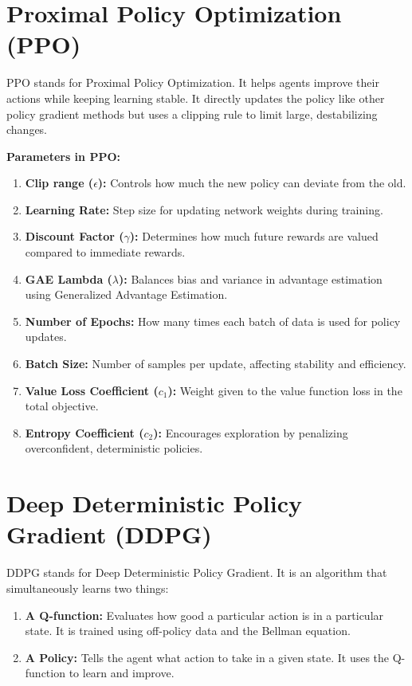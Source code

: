 \documentclass[12pt]{article}
\begin{document}

\section{Proximal Policy Optimization (PPO)}

PPO stands for Proximal Policy Optimization. It helps agents improve their actions while keeping learning stable. It directly updates the policy like other policy gradient methods but uses a clipping rule to limit large, destabilizing changes.

\vspace{2cm}
\textbf{Parameters in PPO:}
\begin{enumerate}
    \item \textbf{Clip range ($\epsilon$):} Controls how much the new policy can deviate from the old.
    \item \textbf{Learning Rate:} Step size for updating network weights during training.
    \item \textbf{Discount Factor ($\gamma$):} Determines how much future rewards are valued compared to immediate rewards.
    \item \textbf{GAE Lambda ($\lambda$):} Balances bias and variance in advantage estimation using Generalized Advantage Estimation.
    \item \textbf{Number of Epochs:} How many times each batch of data is used for policy updates.
    \item \textbf{Batch Size:} Number of samples per update, affecting stability and efficiency.
    \item \textbf{Value Loss Coefficient ($c_1$):} Weight given to the value function loss in the total objective.
    \item \textbf{Entropy Coefficient ($c_2$):} Encourages exploration by penalizing overconfident, deterministic policies.
\end{enumerate}


\section{Deep Deterministic Policy Gradient (DDPG)}

DDPG stands for Deep Deterministic Policy Gradient. It is an algorithm that simultaneously learns two things:
\begin{enumerate}
    \item \textbf{A Q-function:} Evaluates how good a particular action is in a particular state. It is trained using off-policy data and the Bellman equation.
    \item \textbf{A Policy:} Tells the agent what action to take in a given state. It uses the Q-function to learn and improve.
\end{enumerate}
\end{document}
